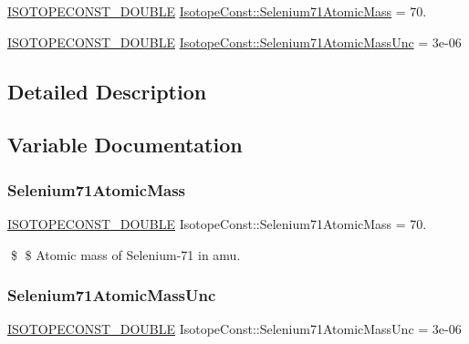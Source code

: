 \begin{DoxyCompactItemize}
\item 
\mbox{\hyperlink{group___isotope_const-_macros_ga8f45a7272ce02c0b4c65c44636ed719a}{I\+S\+O\+T\+O\+P\+E\+C\+O\+N\+S\+T\+\_\+\+D\+O\+U\+B\+LE}} \mbox{\hyperlink{group___isotope_const-_selenium-_se71_gad8889c523ac744a8698140228f9355d9}{Isotope\+Const\+::\+Selenium71\+Atomic\+Mass}} = 70.
\item 
\mbox{\hyperlink{group___isotope_const-_macros_ga8f45a7272ce02c0b4c65c44636ed719a}{I\+S\+O\+T\+O\+P\+E\+C\+O\+N\+S\+T\+\_\+\+D\+O\+U\+B\+LE}} \mbox{\hyperlink{group___isotope_const-_selenium-_se71_ga405d599070a5c6e490ad5bc5e29094ba}{Isotope\+Const\+::\+Selenium71\+Atomic\+Mass\+Unc}} = 3e-\/06
\end{DoxyCompactItemize}


\subsection{Detailed Description}


\subsection{Variable Documentation}
\mbox{\label{group___isotope_const-_selenium-_se71_gad8889c523ac744a8698140228f9355d9}} 
\subsubsection{\texorpdfstring{Selenium71\+Atomic\+Mass}{Selenium71AtomicMass}}
{\footnotesize\ttfamily \mbox{\hyperlink{group___isotope_const-_macros_ga8f45a7272ce02c0b4c65c44636ed719a}{I\+S\+O\+T\+O\+P\+E\+C\+O\+N\+S\+T\+\_\+\+D\+O\+U\+B\+LE}} Isotope\+Const\+::\+Selenium71\+Atomic\+Mass = 70.}

\$ \$ Atomic mass of Selenium-\/71 in amu. \mbox{\label{group___isotope_const-_selenium-_se71_ga405d599070a5c6e490ad5bc5e29094ba}} 
\subsubsection{\texorpdfstring{Selenium71\+Atomic\+Mass\+Unc}{Selenium71AtomicMassUnc}}
{\footnotesize\ttfamily \mbox{\hyperlink{group___isotope_const-_macros_ga8f45a7272ce02c0b4c65c44636ed719a}{I\+S\+O\+T\+O\+P\+E\+C\+O\+N\+S\+T\+\_\+\+D\+O\+U\+B\+LE}} Isotope\+Const\+::\+Selenium71\+Atomic\+Mass\+Unc = 3e-\/06}

